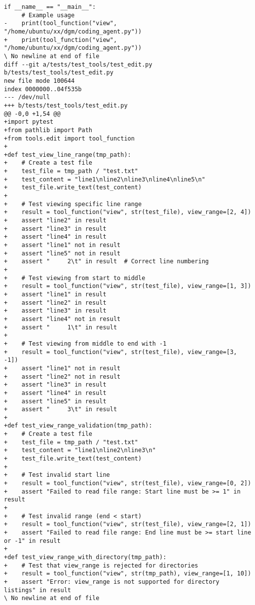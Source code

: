 \begin{lstlisting}[style=diffstyle]
 if __name__ == "__main__":
     # Example usage
-    print(tool_function("view", "/home/ubuntu/xx/dgm/coding_agent.py"))
+    print(tool_function("view", "/home/ubuntu/xx/dgm/coding_agent.py"))
\ No newline at end of file
diff --git a/tests/test_tools/test_edit.py b/tests/test_tools/test_edit.py
new file mode 100644
index 0000000..04f535b
--- /dev/null
+++ b/tests/test_tools/test_edit.py
@@ -0,0 +1,54 @@
+import pytest
+from pathlib import Path
+from tools.edit import tool_function
+
+def test_view_line_range(tmp_path):
+    # Create a test file
+    test_file = tmp_path / "test.txt"
+    test_content = "line1\nline2\nline3\nline4\nline5\n"
+    test_file.write_text(test_content)
+
+    # Test viewing specific line range
+    result = tool_function("view", str(test_file), view_range=[2, 4])
+    assert "line2" in result
+    assert "line3" in result
+    assert "line4" in result
+    assert "line1" not in result
+    assert "line5" not in result
+    assert "     2\t" in result  # Correct line numbering
+
+    # Test viewing from start to middle
+    result = tool_function("view", str(test_file), view_range=[1, 3])
+    assert "line1" in result
+    assert "line2" in result
+    assert "line3" in result
+    assert "line4" not in result
+    assert "     1\t" in result
+
+    # Test viewing from middle to end with -1
+    result = tool_function("view", str(test_file), view_range=[3, -1])
+    assert "line1" not in result
+    assert "line2" not in result
+    assert "line3" in result
+    assert "line4" in result
+    assert "line5" in result
+    assert "     3\t" in result
+
+def test_view_range_validation(tmp_path):
+    # Create a test file
+    test_file = tmp_path / "test.txt"
+    test_content = "line1\nline2\nline3\n"
+    test_file.write_text(test_content)
+
+    # Test invalid start line
+    result = tool_function("view", str(test_file), view_range=[0, 2])
+    assert "Failed to read file range: Start line must be >= 1" in result
+
+    # Test invalid range (end < start)
+    result = tool_function("view", str(test_file), view_range=[2, 1])
+    assert "Failed to read file range: End line must be >= start line or -1" in result
+
+def test_view_range_with_directory(tmp_path):
+    # Test that view_range is rejected for directories
+    result = tool_function("view", str(tmp_path), view_range=[1, 10])
+    assert "Error: view_range is not supported for directory listings" in result
\ No newline at end of file
\end{lstlisting}
